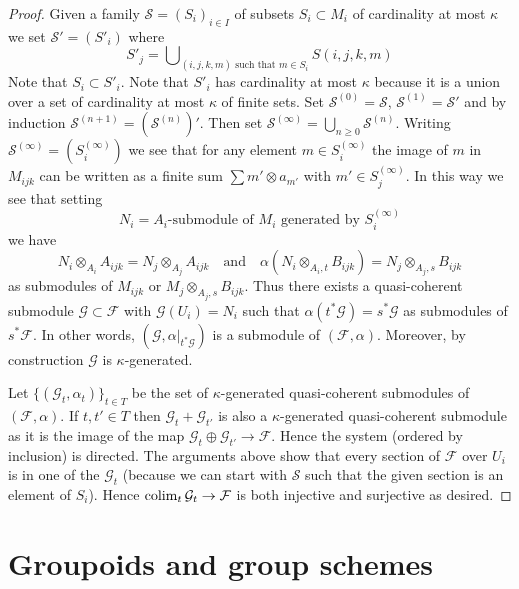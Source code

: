\begin{proof}
\medskip\noindent
Given a family $\mathcal{S} = (S_i)_{i \in I}$ of subsets
$S_i \subset M_i$ of cardinality at most $\kappa$ we set
$\mathcal{S}' = (S'_i)$ where
$$
S'_j = \bigcup\nolimits_{(i, j, k, m)\text{ such that }m \in S_i}
S(i, j, k, m)
$$
Note that $S_i \subset S'_i$. Note that $S'_i$ has cardinality at most
$\kappa$ because it is a union over a set of cardinality at most $\kappa$
of finite sets. Set $\mathcal{S}^{(0)} = \mathcal{S}$,
$\mathcal{S}^{(1)} = \mathcal{S}'$ and by induction
$\mathcal{S}^{(n + 1)} = (\mathcal{S}^{(n)})'$. Then set
$\mathcal{S}^{(\infty)} = \bigcup_{n \geq 0} \mathcal{S}^{(n)}$.
Writing $\mathcal{S}^{(\infty)} = (S^{(\infty)}_i)$ we see that
for any element $m \in S^{(\infty)}_i$ the image of $m$ in
$M_{ijk}$ can be written as a finite sum $\sum m' \otimes a_{m'}$
with $m' \in S_j^{(\infty)}$. In this way we see that setting
$$
N_i = A_i\text{-submodule of }M_i\text{ generated by }S^{(\infty)}_i
$$
we have
$$
N_i \otimes_{A_i} A_{ijk} = N_j \otimes_{A_j} A_{ijk}
\quad\text{and}\quad
\alpha(N_i \otimes_{A_i, t} B_{ijk}) = N_j \otimes_{A_j, s} B_{ijk}
$$
as submodules of $M_{ijk}$ or $M_j \otimes_{A_j, s} B_{ijk}$.
Thus there exists a quasi-coherent submodule
$\mathcal{G} \subset \mathcal{F}$ with $\mathcal{G}(U_i) = N_i$
such that $\alpha(t^*\mathcal{G}) = s^*\mathcal{G}$ as submodules
of $s^*\mathcal{F}$. In other words,
$(\mathcal{G}, \alpha|_{t^*\mathcal{G}})$ is a submodule of
$(\mathcal{F}, \alpha)$.
Moreover, by construction $\mathcal{G}$ is $\kappa$-generated.

\medskip\noindent
Let $\{(\mathcal{G}_t, \alpha_t)\}_{t \in T}$ be the set of
$\kappa$-generated quasi-coherent submodules of $(\mathcal{F}, \alpha)$.
If $t, t' \in T$ then $\mathcal{G}_t + \mathcal{G}_{t'}$ is also a
$\kappa$-generated quasi-coherent submodule as it is the image of the map
$\mathcal{G}_t \oplus \mathcal{G}_{t'} \to \mathcal{F}$.
Hence the system (ordered by inclusion) is directed.
The arguments above show that every section of $\mathcal{F}$ over $U_i$
is in one of the $\mathcal{G}_t$ (because we can start with $\mathcal{S}$
such that the given section is an element of $S_i$). Hence
$\mathop{\mathrm{colim}}\nolimits_t \mathcal{G}_t \to \mathcal{F}$ is both injective and surjective
as desired.
\end{proof}





\section{Groupoids and group schemes}
\label{section-groupoids-group-schemes}


